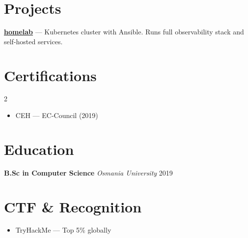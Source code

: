 \documentclass[10pt, letterpaper]{article}
\begin{document}
\section{Projects}

\textbf{\href{https://github.com/4-sai/homelab}{homelab}} —  Kubernetes cluster with Ansible. Runs full observability stack and self-hosted services.\\[3pt]

\section{Certifications}

\begin{multicols}{2}
\begin{itemize}
  \item CEH — EC-Council (2019)
\end{itemize}
\end{multicols}

\section{Education}

\textbf{B.Sc in Computer Science} \hfill \textit{Osmania University} \hfill \textcolor{mutedtext}{2019}

\section{CTF \& Recognition}

\begin{itemize}
  \item TryHackMe — Top 5\% globally
\end{itemize}
\end{document}

